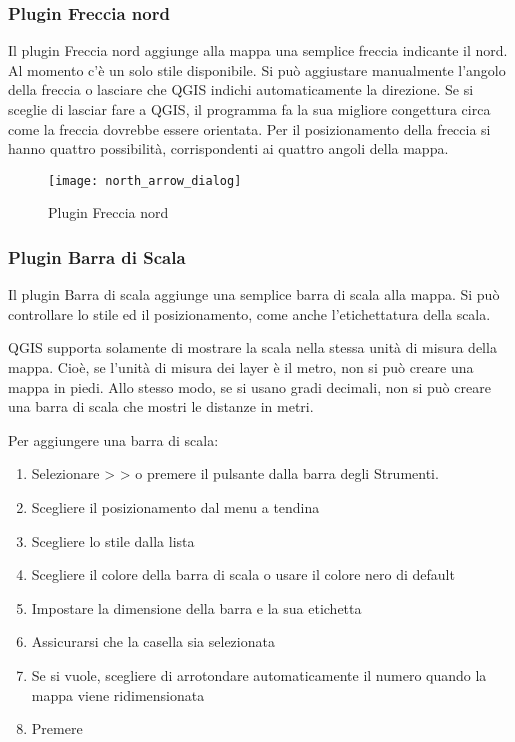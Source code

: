 \subsubsection{Plugin Freccia nord}

Il plugin Freccia nord aggiunge alla mappa una semplice freccia indicante il nord. Al momento c'è un solo stile disponibile. Si può aggiustare manualmente l'angolo della freccia o lasciare che QGIS indichi automaticamente la direzione. Se si sceglie di lasciar fare a QGIS, il programma fa la sua migliore congettura circa come la freccia dovrebbe essere orientata. Per il posizionamento della freccia si hanno quattro possibilità, corrispondenti ai quattro angoli della mappa.

\begin{figure}[ht]
   \begin{center}
   \caption{Plugin Freccia nord \nixcaption}\label{fig:north_arrow}\smallskip
   \texttt{[image: north\_arrow\_dialog]}
\end{center}  
\end{figure}

\subsubsection{Plugin Barra di Scala }
Il plugin Barra di scala aggiunge una semplice barra di scala alla mappa. Si può controllare lo stile ed il posizionamento, come anche l'etichettatura della scala.

QGIS supporta solamente di mostrare la scala nella stessa unità di misura della mappa. Cioè, se l'unità di misura dei layer è il metro, non si può creare una mappa in piedi. Allo stesso modo, se si usano gradi decimali, non si può creare una barra di scala che mostri le distanze in metri.

Per aggiungere una barra di scala:

\begin{enumerate}
\item Selezionare  >  >  o premere il pulsante  dalla barra degli Strumenti.
\item Scegliere il posizionamento dal menu a tendina 
\item Scegliere lo stile dalla lista 
\item Scegliere il colore della barra di scala  o usare il colore nero di default
\item Impostare la dimensione della barra e la sua etichetta 
\item Assicurarsi che la casella  sia selezionata
\item Se si vuole, scegliere di arrotondare automaticamente il numero quando la mappa viene ridimensionata 
\item Premere  
\end{enumerate} 

